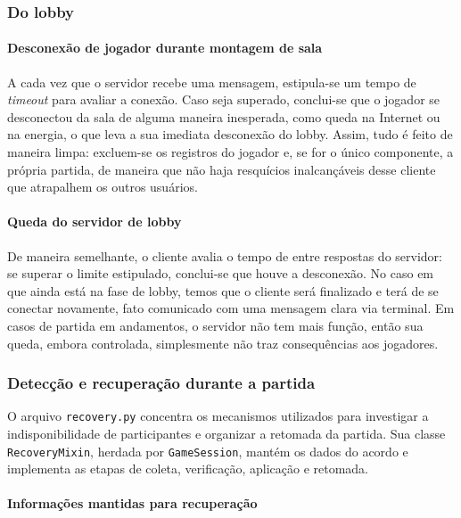 \documentclass[11pt,a4paper]{article}
\begin{document}
\subsubsection{Do lobby}

\paragraph{Desconexão de jogador durante montagem de sala}

A cada vez que o servidor recebe uma mensagem, estipula-se um tempo de \textit{timeout} para avaliar a conexão. Caso seja superado, conclui-se que o jogador se desconectou da sala de alguma maneira inesperada, como queda na Internet ou na energia, o que leva a sua imediata desconexão do lobby. Assim, tudo é feito de maneira limpa: excluem-se os registros do jogador e, se for o único componente, a própria partida, de maneira que não haja resquícios inalcançáveis desse cliente que atrapalhem os outros usuários.

\paragraph{Queda do servidor de lobby}

De maneira semelhante, o cliente avalia o tempo de entre respostas do servidor: se superar o limite estipulado, conclui-se que houve a desconexão. No caso em que ainda está na fase de lobby, temos que o cliente será finalizado e terá de se conectar novamente, fato comunicado com uma mensagem clara via terminal. Em casos de partida em andamentos, o servidor não tem mais função, então sua queda, embora controlada, simplesmente não traz consequências aos jogadores.


\subsubsection{Detecção e recuperação durante a partida}
\label{sec:implementacao-recovery}

O arquivo \texttt{recovery.py} concentra os mecanismos utilizados para investigar a indisponibilidade de participantes e organizar a retomada da partida. Sua classe \texttt{RecoveryMixin}, herdada por \texttt{GameSession}, mantém os dados do acordo e implementa as etapas de coleta, verificação, aplicação e retomada.

\paragraph{Informações mantidas para recuperação}
\end{document}
